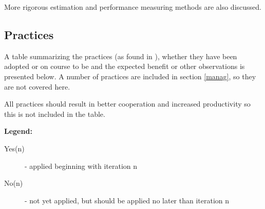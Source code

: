 \documentclass[10pt]{report}
\begin{document}
More rigorous estimation and performance measuring methods are also discussed.

\subsection{Practices}

A table summarizing the practices (as found in \cite{extremep}), whether they have been adopted or on course to be and the expected benefit or other observations is presented below. A number of practices are included in section \ref{manag}, so they are not covered here.

All practices should result in better cooperation and increased productivity so this is not included in the table.

{\bf Legend:}
\begin{description}
\item [Yes(n)] - applied beginning with iteration n 
\item [No(n)] - not yet applied, but should be applied no later than iteration n 
\end{description}
\end{document}
